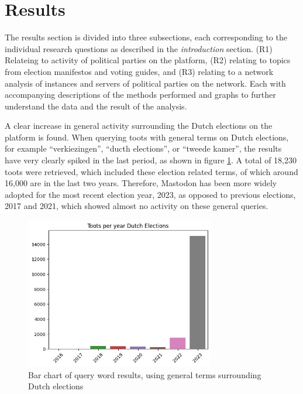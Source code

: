 \section{Results}
The results section is divided into three subsections, each corresponding to the individual research questions as described in the \textit{introduction} section. (R1) Relateing to activity of political parties on the platform, (R2) relating to topics from election manifestos and voting guides, and (R3) relating to a network analysis of instances and servers of political parties on the network. Each with accompanying descriptions of the methods performed and graphs to further understand the data and the result of the analysis.

A clear increase in general activity surrounding the Dutch elections on the platform is found.
When querying toots with general terms on Dutch elections, for example “verkiezingen”, “ducth elections”, or “tweede kamer”, the results have very clearly spiked in the last period, as shown in figure \ref{fig:electionstotal}. A total of 18,230 toots were retrieved, which included these election related terms, of which around 16,000 are in the last two years.
Therefore, Mastodon has been more widely adopted for the most recent election year, 2023, as opposed to previous elections, 2017 and 2021, which showed almost no activity on these general queries.

\begin{figure}[ht]
  \centering
  \includegraphics[width=3.25in]{media/dutch-elections-mastodon.jpeg}
  \caption{Bar chart of query word results, using general terms surrounding Dutch elections}
  \label{fig:electionstotal}
\end{figure}

